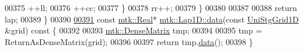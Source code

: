 \begin{DoxyCode}
00375       ++ll;
00376       ++cc;
00377     \}
00378     rr++;
00379   \}
00380 
00387 
00388   \textcolor{keywordflow}{return} lap;
00389 \}
00390 
\hypertarget{mtk__lap__1d_8cc_source_l00391}{}\hyperlink{classmtk_1_1Lap1D_ab2652725a8407c79247680c7bbd073b8}{00391} \textcolor{keyword}{const} \hyperlink{group__c01-roots_gac080bbbf5cbb5502c9f00405f894857d}{mtk::Real}* \hyperlink{classmtk_1_1Lap1D_ab2652725a8407c79247680c7bbd073b8}{mtk::Lap1D::data}(\textcolor{keyword}{const} \hyperlink{classmtk_1_1UniStgGrid1D}{UniStgGrid1D} &grid)\textcolor{keyword}{ const }\{
00392 
00393   \hyperlink{classmtk_1_1DenseMatrix}{mtk::DenseMatrix} tmp;
00394 
00395   tmp = ReturnAsDenseMatrix(grid);
00396 
00397   \textcolor{keywordflow}{return} tmp.\hyperlink{classmtk_1_1DenseMatrix_a0c33b8a9e01d157c61ddbdf807c25d84}{data}();
00398 \}
\end{DoxyCode}
